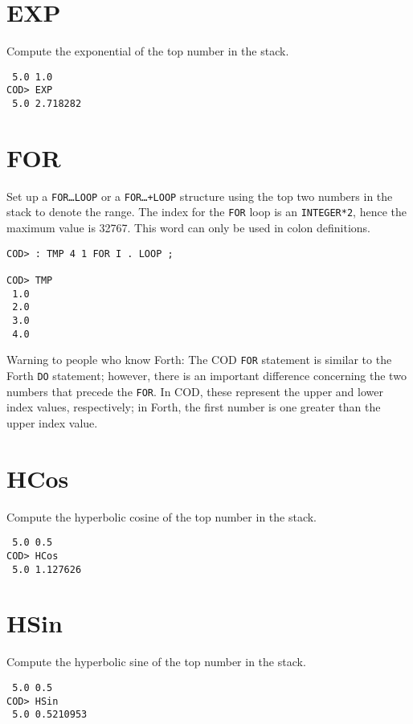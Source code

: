 \section*{EXP}
Compute the exponential of the top number in the stack.

\medskip
{}
\begin{verbatim}
 5.0 1.0
COD> EXP
 5.0 2.718282
\end{verbatim}

\section*{FOR}
Set up a {\tt FOR\ldots LOOP} or a {\tt FOR\ldots +LOOP} structure
using the top two numbers in the stack to denote the range.
The index for the {\tt FOR} loop is an {\tt INTEGER*2},
hence the maximum value is 32767.
This word can only be used in colon definitions.

\medskip
{}
\begin{verbatim}
COD> : TMP 4 1 FOR I . LOOP ;

COD> TMP
 1.0
 2.0
 3.0
 4.0
\end{verbatim}
Warning to people who know Forth:
The COD {\tt FOR} statement is similar to the Forth {\tt DO} statement;
however, there is an important difference
concerning the two numbers that precede the {\tt FOR}\@.
In COD, these represent the upper and lower index values, respectively;
in Forth, the first number is one greater than the upper index value.

\section*{HCos}
Compute the hyperbolic cosine of the top number in the stack.

\medskip
{}
\begin{verbatim}
 5.0 0.5
COD> HCos
 5.0 1.127626
\end{verbatim}

\section*{HSin}
Compute the hyperbolic sine of the top number in the stack.

\medskip
{}
\begin{verbatim}
 5.0 0.5
COD> HSin
 5.0 0.5210953
\end{verbatim}

